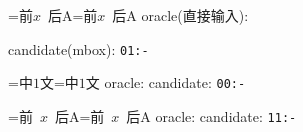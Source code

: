 \documentclass{article}
\begin{document}
=\hbox{前$x$ 后A}=\hbox{前\mbox{$x$} 后A}%
oracle(直接输入): 

candidate(mbox): \quad
\texttt{01:\the\dimexpr{}-\relax}

\medskip
{}=\hbox{中$1$文}=\hbox{中\mbox{$1$}文}%
oracle: \quad candidate: \quad
\texttt{00:\the\dimexpr{}-\relax}

\medskip
{}=\hbox{前 $x$ 后A}=\hbox{前 \mbox{$x$} 后A}%
oracle: \quad candidate: \quad
\texttt{11:\the\dimexpr{}-\relax}
\end{document}
